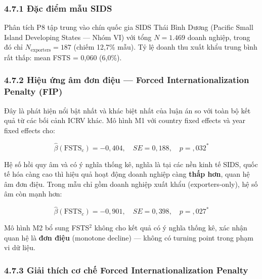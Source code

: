 \documentclass[12pt,a4paper]{article}
\begin{document}
\hypertarget{471-ux111ux1eb7c-ux111iux1ec3m-mux1eabu-sids}{%
\subsubsection{4.7.1 Đặc điểm mẫu
SIDS}\label{471-ux111ux1eb7c-ux111iux1ec3m-mux1eabu-sids}}

Phân tích P8 tập trung vào chín quốc gia SIDS Thái Bình Dương (Pacific
Small Island Developing States --- Nhóm VI) với tổng \(N = 1.469\) doanh
nghiệp, trong đó chỉ \(N_{\text{exporters}} = 187\) (chiếm 12,7\% mẫu).
Tỷ lệ doanh thu xuất khẩu trung bình rất thấp: mean FSTS = 0,060
(6,0\%).

\hypertarget{472-hiux1ec7u-ux1ee9ng-uxe2m-ux111ux1a1n-ux111iux1ec7u--forced-internationalization-penalty-fip}{%
\subsubsection{4.7.2 Hiệu ứng âm đơn điệu --- Forced
Internationalization Penalty
(FIP)}\label{472-hiux1ec7u-ux1ee9ng-uxe2m-ux111ux1a1n-ux111iux1ec7u--forced-internationalization-penalty-fip}}

Đây là phát hiện nổi bật nhất và khác biệt nhất của luận án so với toàn
bộ kết quả từ các bối cảnh ICRV khác. Mô hình M1 với country fixed
effects và year fixed effects cho:

\[\hat{\beta}(\text{FSTS}_c) = -0{,}404, \quad SE = 0{,}188, \quad p = {,}032^{*}\]

Hệ số hồi quy âm và có ý nghĩa thống kê, nghĩa là tại các nền kinh tế
SIDS, quốc tế hóa càng cao thì hiệu quả hoạt động doanh nghiệp càng
\textbf{thấp hơn}, quan hệ âm đơn điệu. Trong mẫu chỉ gồm doanh nghiệp
xuất khẩu (exporters-only), hệ số âm còn mạnh hơn:

\[\hat{\beta}(\text{FSTS}_c) = -0{,}901, \quad SE = 0{,}398, \quad p = {,}027^{*}\]

Mô hình M2 bổ sung FSTS\(^2\) không cho kết quả có ý nghĩa thống kê, xác
nhận quan hệ là \textbf{đơn điệu} (monotone decline) --- không có
turning point trong phạm vi dữ liệu.

\hypertarget{473-giux1ea3i-thuxedch-cux1a1-chux1ebf-forced-internationalization-penalty}{%
\subsubsection{4.7.3 Giải thích cơ chế Forced Internationalization
Penalty}\label{473-giux1ea3i-thuxedch-cux1a1-chux1ebf-forced-internationalization-penalty}}
\end{document}
